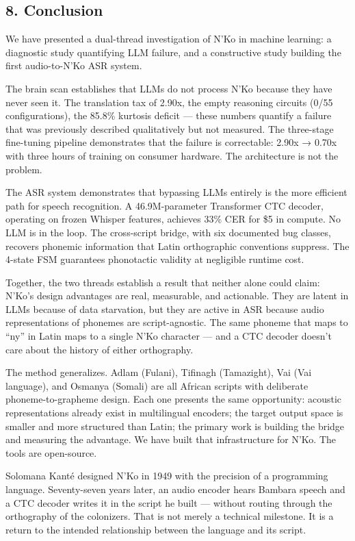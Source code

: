 \documentclass[
]{article}
\begin{document}
\subsection{8. Conclusion}\label{conclusion}

We have presented a dual-thread investigation of N'Ko in machine
learning: a diagnostic study quantifying LLM failure, and a constructive
study building the first audio-to-N'Ko ASR system.

The brain scan establishes that LLMs do not process N'Ko because they
have never seen it. The translation tax of 2.90x, the empty reasoning
circuits (0/55 configurations), the 85.8\% kurtosis deficit --- these
numbers quantify a failure that was previously described qualitatively
but not measured. The three-stage fine-tuning pipeline demonstrates that
the failure is correctable: 2.90x → 0.70x with three hours of training
on consumer hardware. The architecture is not the problem.

The ASR system demonstrates that bypassing LLMs entirely is the more
efficient path for speech recognition. A 46.9M-parameter Transformer CTC
decoder, operating on frozen Whisper features, achieves 33\% CER for \$5
in compute. No LLM is in the loop. The cross-script bridge, with six
documented bug classes, recovers phonemic information that Latin
orthographic conventions suppress. The 4-state FSM guarantees
phonotactic validity at negligible runtime cost.

Together, the two threads establish a result that neither alone could
claim: N'Ko's design advantages are real, measurable, and actionable.
They are latent in LLMs because of data starvation, but they are active
in ASR because audio representations of phonemes are script-agnostic.
The same phoneme that maps to ``ny'' in Latin maps to a single N'Ko
character --- and a CTC decoder doesn't care about the history of either
orthography.

The method generalizes. Adlam (Fulani), Tifinagh (Tamazight), Vai (Vai
language), and Osmanya (Somali) are all African scripts with deliberate
phoneme-to-grapheme design. Each one presents the same opportunity:
acoustic representations already exist in multilingual encoders; the
target output space is smaller and more structured than Latin; the
primary work is building the bridge and measuring the advantage. We have
built that infrastructure for N'Ko. The tools are open-source.

Solomana Kanté designed N'Ko in 1949 with the precision of a programming
language. Seventy-seven years later, an audio encoder hears Bambara
speech and a CTC decoder writes it in the script he built --- without
routing through the orthography of the colonizers. That is not merely a
technical milestone. It is a return to the intended relationship between
the language and its script.
\end{document}
